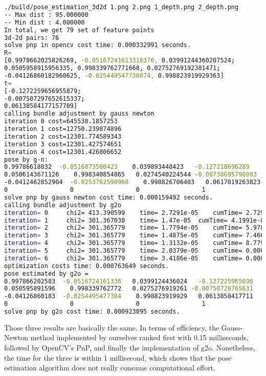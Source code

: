 \begin{lstlisting}[language=sh,caption=终端输入：]
./build/pose_estimation_3d2d 1.png 2.png 1_depth.png 2_depth.png
-- Max dist : 95.000000 
-- Min dist : 4.000000 
In total, we get 79 set of feature points
3d-2d pairs: 76
solve pnp in opencv cost time: 0.000332991 seconds.
R=
[0.9978662025826269, -0.05167241613316376, 0.03991244360207524;
0.0505958915956335, 0.998339762771668, 0.02752769192381471;
-0.04126860182960625, -0.025449547736074, 0.998823919929363]
t=
[-0.1272259656955879;
-0.007507297652615337;
0.06138584177157709]
calling bundle adjustment by gauss newton
iteration 0 cost=645538.1857253
iteration 1 cost=12750.239874896
iteration 2 cost=12301.774589343
iteration 3 cost=12301.427574651
iteration 4 cost=12301.426806652
pose by g-n: 
0.99786618832  -0.0516873580423    0.039893448423   -0.127218696289
0.0506143671126    0.998340854865   0.0274540224544 -0.00738695798083
-0.0412462852904  -0.0253762590968    0.998826706403   0.0617019263823
0                 0                 0                 1
solve pnp by gauss newton cost time: 0.000159492 seconds.
calling bundle adjustment by g2o
iteration= 0	 chi2= 413.390599	 time= 2.7291e-05	 cumTime= 2.7291e-05	 edges= 76	 schur= 0	 lambda= 79.000412	 levenbergIter= 1
iteration= 1	 chi2= 301.367030	 time= 1.47e-05	 cumTime= 4.1991e-05	 edges= 76	 schur= 0	 lambda= 26.333471	 levenbergIter= 1
iteration= 2	 chi2= 301.365779	 time= 1.7794e-05	 cumTime= 5.9785e-05	 edges= 76	 schur= 0	 lambda= 17.555647	 levenbergIter= 1
iteration= 3	 chi2= 301.365779	 time= 1.4875e-05	 cumTime= 7.466e-05	 edges= 76	 schur= 0	 lambda= 11.703765	 levenbergIter= 1
iteration= 4	 chi2= 301.365779	 time= 1.3132e-05	 cumTime= 8.7792e-05	 edges= 76	 schur= 0	 lambda= 7.802510	 levenbergIter= 1
iteration= 5	 chi2= 301.365779	 time= 2.0379e-05	 cumTime= 0.000108171	 edges= 76	 schur= 0	 lambda= 41.613386	 levenbergIter= 3
iteration= 6	 chi2= 301.365779	 time= 3.4186e-05	 cumTime= 0.000142357	 edges= 76	 schur= 0	 lambda= 2859650082279.672363	 levenbergIter= 8
optimization costs time: 0.000763649 seconds.
pose estimated by g2o =
0.997866202583  -0.0516724161336   0.0399124436024   -0.127225965696
0.050595891596    0.998339762772   0.0275276919261 -0.00750729765631
-0.04126860183  -0.0254495477384    0.998823919929   0.0613858417711
0                 0                 0                 1
solve pnp by g2o cost time: 0.000923095 seconds.
\end{lstlisting}

Those three results are basically the same. In terms of efficiency, the Gauss-Newton method implemented by ourselves ranked first with 0.15 milliseconds, followed by OpenCV's PnP, and finally the implementation of g2o. Nonetheless, the time for the three is within 1 millisecond, which shows that the pose estimation algorithm does not really consume computational effort.

